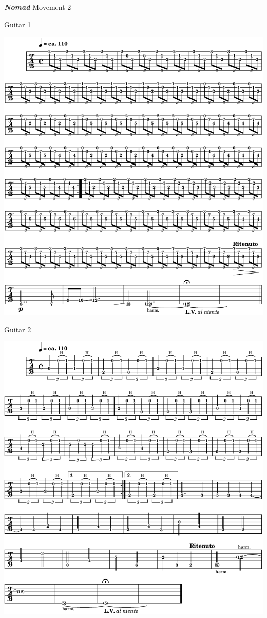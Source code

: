 \newpage

\quad \quad \textbf{\textsl{Nomad}} Movement 2 

\smallskip

\quad \quad \quad Guitar 1

\begin{center}
\includegraphics[scale=0.45]{img/neB1}
\end{center}

\quad \quad \quad Guitar 2

\begin{center}
\includegraphics[scale=0.45]{img/neB2}
\end{center}

